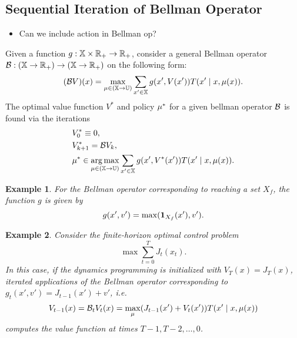 \documentclass[conference]{IEEEtran}
\newtheorem{example}{Example}
\newcommand{\red}[1]{{\color{red} #1 }}
\begin{document}
\subsection{Sequential Iteration of Bellman Operator}

\begin{itemize}
  \item \red{Can we include action in Bellman op?}
\end{itemize}

Given a function $g: \mathbb{X} \times \mathbb{R}_+ \rightarrow \mathbb{R}_+$, consider a general Bellman operator $\mathcal{B} : (\mathbb{X} \rightarrow \mathbb{R}_+) \rightarrow (\mathbb{X} \rightarrow \mathbb{R}_+)$ on the following form:
\begin{equation}
  (\mathcal{B} V) (x) = \max_{\mu \in (\mathbb{X} \rightarrow \mathbb{U})} \sum_{x' \in \mathbb{X}}  g(x', V(x')) T(x' \mid x, \mu(x)).
\end{equation}
The optimal value function $V^*$ and policy $\mu^*$ for a given bellman operator $\mathcal{B}$ is found via the iterations
\begin{subequations}
  \begin{align}
    & V^*_0 \equiv 0, \\
    & V^*_{k+1}  = \bellman V_k \label{eq:iter}, \\
    & \pol^* \in \argmax_{\pol \in (\X \rightarrow \U)} \sum_{x' \in \X}  g(x', V^*(x')) T(x' \mid x, \pol(x)).
  \end{align}
\end{subequations}

\begin{example}
  For the Bellman operator corresponding to reaching a set $X_f$, the function $g$ is given by
  \begin{equation*}
    g(x', v') = \max( \mathbf{1}_{X_f}(x'), v').
  \end{equation*}
\end{example}

\begin{example}
  Consider the finite-horizon optimal control problem 
  \begin{equation}
     \max \sum_{t=0}^T J_t(x_t).
  \end{equation} 
  In this case, if the dynamics programming is initialized with $V_T(x) = J_T(x)$, iterated applications of the Bellman operator corresponding to $g_t(x', v') = J_{t-1}(x') + v'$, i.e.
  \begin{equation*}
    V_{t-1}(x) = \mathcal{B}_t V_{t} (x) = \max_{\mu} (J_{t-1}(x') + V_{t}(x')) T(x' \mid x, \mu(x))
  \end{equation*}
  computes the value function at times $T-1, T-2, \ldots, 0$.
\end{example}
\end{document}
